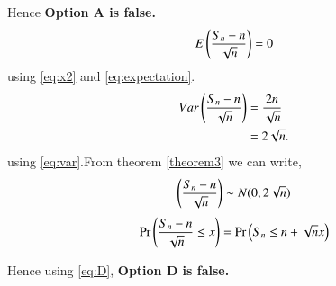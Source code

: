 \documentclass[journal,12pt,twocolumn]{IEEEtran}
\begin{document}
Hence \textbf{Option A is false.}
\begin{equation}
    E\left(\frac{S_{n}-n}{\sqrt{n}}\right)=0
\end{equation}
using \eqref{eq:x2} and \eqref{eq:expectation}.
\begin{align}
     Var\left(\frac{S_{n}-n}{\sqrt{n}}\right)&=\frac{2n}{\sqrt{n}}\\
     &=2\sqrt{n}.
\end{align}
using \eqref{eq:var}.From theorem \ref{theorem3} we can write,
\begin{equation}
    \left(\frac{S_{n}-n}{\sqrt{n}}\right) \sim N(0,2 \sqrt{n})\label{eq:D}
\end{equation}
\begin{equation}
     \Pr{\ensuremath{\left(\frac{S_{n}-n}{\sqrt{n}} \leq x\right)}}= \Pr{\ensuremath{\left(S_{n} \leq n+\sqrt{n}x\right)}}
\end{equation}

Hence using \eqref{eq:D}, \textbf{Option D is false.}
\end{document}
